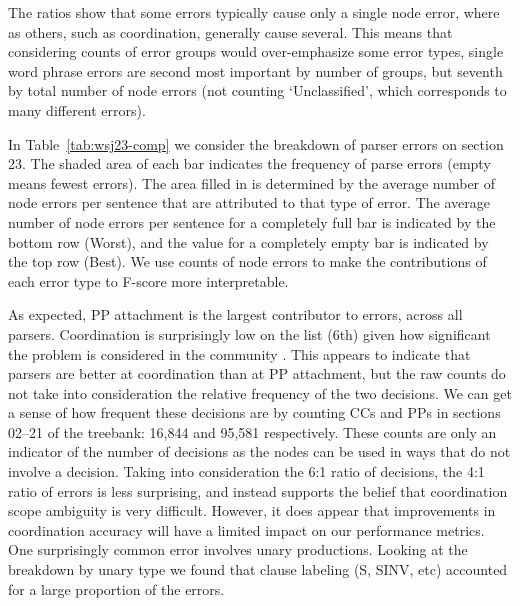 The ratios show that some errors typically cause only a single node error, where as others, such as coordination, generally cause several.
This means that considering counts of error groups would over-emphasize some error types, \myeg single word phrase errors are second most important by number of groups, but seventh by total number of node errors (not counting `Unclassified', which corresponds to many different errors).

In Table~\ref{tab:wsj23-comp} we consider the breakdown of parser errors on \wsj section 23.
The shaded area of each bar indicates the frequency of parse errors (\myie empty means fewest errors).
The area filled in is determined by the average number of node errors per sentence that are attributed to that type of error.
The average number of node errors per sentence for a completely full bar is indicated by the bottom row (Worst), and the value for a completely empty bar is indicated by the top row (Best).
We use counts of node errors to make the contributions of each error type to F-score more interpretable.

As expected, PP attachment is the largest contributor to errors, across all parsers.
Coordination is surprisingly low on the list (6th) given how significant the problem is considered in the community \parencite{N06-1020}.
This appears to indicate that parsers are better at coordination than at PP attachment, but the raw counts do not take into consideration the relative frequency of the two decisions.
We can get a sense of how frequent these decisions are by counting CCs and PPs in sections 02--21 of the treebank: 16,844 and 95,581 respectively.
These counts are only an indicator of the number of decisions as the nodes can be used in ways that do not involve a decision.
Taking into consideration the 6:1 ratio of decisions, the 4:1 ratio of errors is less surprising, and instead supports the belief that coordination scope ambiguity is very difficult.
However, it does appear that improvements in coordination accuracy will have a limited impact on our performance metrics.
One surprisingly common error involves unary productions.
Looking at the breakdown by unary type we found that clause labeling (S, SINV, etc) accounted for a large proportion of the errors.

\begin{landscape}

\end{landscape}

